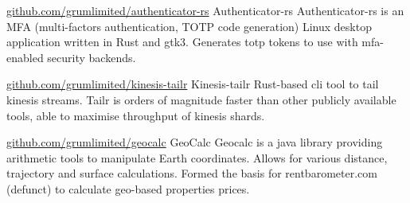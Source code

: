 

\begin{cventries}

  \cventry
    {\href{https://github.com/grumlimited/authenticator-rs}{github.com/grumlimited/authenticator-rs}} %
     {\hspace{0.2em}Authenticator-rs} %
    {} %
    {} %
    {
Authenticator-rs is an MFA (multi-factors authentication, TOTP code generation) Linux desktop application written in Rust and gtk3. Generates totp tokens to use with mfa-enabled security backends.
    }
    
  \cventry
    {\href{https://github.com/grumlimited/kinesis-tailr}{github.com/grumlimited/kinesis-tailr}} %
     {\hspace{0.2em}Kinesis-tailr} %
    {} %
    {} %
    {
Rust-based cli tool to tail kinesis streams. Tailr is orders of magnitude faster than other publicly available tools, able to maximise throughput of kinesis shards.
    }


  \cventry
    {\href{https://github.com/grumlimited/geocalc}{github.com/grumlimited/geocalc}} %
    {\hspace{0.2em}GeoCalc} %
    {} %
    {} %
    {
Geocalc is a java library providing arithmetic tools to manipulate Earth coordinates. Allows for various distance, trajectory and surface calculations. Formed the basis for rentbarometer.com (defunct) to calculate geo-based properties prices.
    }

\end{cventries}
